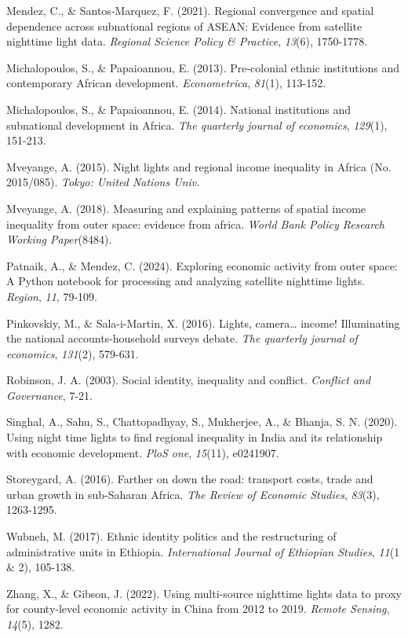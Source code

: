 Mendez, C., \& Santos‐Marquez, F. (2021). Regional convergence and
spatial dependence across subnational regions of ASEAN: Evidence from
satellite nighttime light data. \emph{Regional Science Policy \&
Practice}, \emph{13}(6), 1750-1778.

Michalopoulos, S., \& Papaioannou, E. (2013). Pre‐colonial ethnic
institutions and contemporary African development. \emph{Econometrica},
\emph{81}(1), 113-152.

Michalopoulos, S., \& Papaioannou, E. (2014). National institutions and
subnational development in Africa. \emph{The quarterly journal of
economics}, \emph{129}(1), 151-213.

Mveyange, A. (2015). Night lights and regional income inequality in
Africa (No. 2015/085). \emph{Tokyo: United Nations Univ}.

Mveyange, A. (2018). Measuring and explaining patterns of spatial income
inequality from outer space: evidence from africa. \emph{World Bank
Policy Research Working Paper}(8484).

Patnaik, A., \& Mendez, C. (2024). Exploring economic activity from
outer space: A Python notebook for processing and analyzing satellite
nighttime lights. \emph{Region}, \emph{11}, 79-109.

Pinkovskiy, M., \& Sala-i-Martin, X. (2016). Lights, camera\ldots{}
income! Illuminating the national accounts-household surveys debate.
\emph{The quarterly journal of economics}, \emph{131}(2), 579-631.

Robinson, J. A. (2003). Social identity, inequality and conflict.
\emph{Conflict and Governance}, 7-21.

Singhal, A., Sahu, S., Chattopadhyay, S., Mukherjee, A., \& Bhanja, S.
N. (2020). Using night time lights to find regional inequality in India
and its relationship with economic development. \emph{PloS one},
\emph{15}(11), e0241907.

Storeygard, A. (2016). Farther on down the road: transport costs, trade
and urban growth in sub-Saharan Africa. \emph{The Review of Economic
Studies}, \emph{83}(3), 1263-1295.

Wubneh, M. (2017). Ethnic identity politics and the restructuring of
administrative units in Ethiopia. \emph{International Journal of
Ethiopian Studies}, \emph{11}(1 \& 2), 105-138.

Zhang, X., \& Gibson, J. (2022). Using multi-source nighttime lights
data to proxy for county-level economic activity in China from 2012 to
2019. \emph{Remote Sensing}, \emph{14}(5), 1282.

